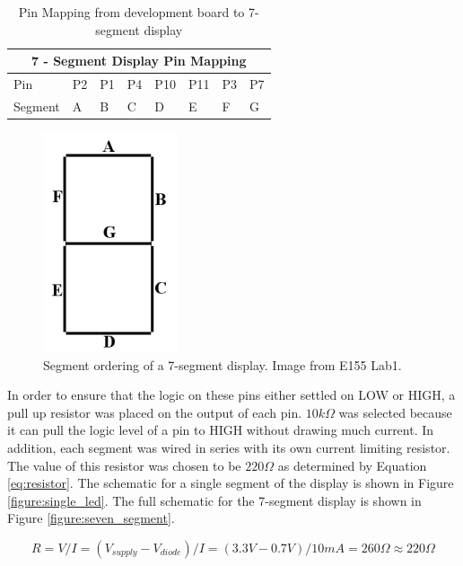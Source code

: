 \documentclass[11pt]{article}
\begin{document}
\begin{table}[h]
\label{tb:pin_mapping}
\center
\begin{tabular}{|l|l|l|l|l|l|l|l|}
\hline
\multicolumn{8}{|c|}{7 - Segment Display Pin Mapping} \\ \hline
Pin       & P2  & P1  & P4  & P10  & P11  & P3  & P7  \\ \hline
Segment   & A   & B   & C   & D    & E    & F   & G   \\ \hline
\end{tabular}
\caption{Pin Mapping from development board to 7-segment display}
\end{table}


\begin{figure}[h!]
\centering
\includegraphics[scale=0.6]{seven_segment_layout.png}
\caption{Segment ordering of a 7-segment display. Image from E155 Lab1.}
\label{figure:seven_segement_layout}
\end{figure} 


In order to ensure that the logic on these pins either settled on LOW or HIGH, a pull up resistor was placed on the output of each pin. $10k\Omega$ was selected because it can pull the logic level of a pin to HIGH without drawing much current. In addition, each segment was wired in series with its own current limiting resistor. The value of this resistor was chosen to be $220\Omega$ as determined by Equation \ref{eq:resistor}. The schematic for a single segment of the display is shown in Figure \ref{figure:single_led}. The full schematic for the 7-segment display is shown in Figure \ref{figure:seven_segment}.


\begin{equation}
\label{eq:resistor}
R = V/I
  = (V_{supply}-V_{diode})/I
  = (3.3V - 0.7V)/10mA
  = 260\Omega
 \approx 220\Omega
\end{equation} 
		
\end{document}
